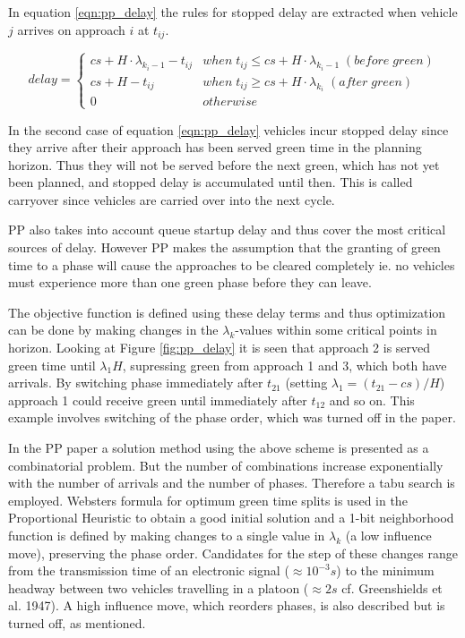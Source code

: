 In equation \ref{eqn:pp_delay} the rules for stopped delay are extracted when vehicle $j$ arrives on approach $i$ at $t_{ij}$.

\begin{equation}
delay = 
\begin{cases}
cs + H \cdot \lambda_{k_i-1} - t_{ij} & when \; t_{ij} \leq cs + H \cdot \lambda_{k_i-1} \; (before\;green)  \\
cs + H - t_{ij} & when \; t_{ij} \geq cs + H \cdot \lambda_{k_i} \; (after\;green)  \\
0 & otherwise
\end{cases}
\label{eqn:pp_delay}
\end{equation}

In the second case of equation \ref{eqn:pp_delay} vehicles incur stopped delay since they arrive after their approach has been served green time in the planning horizon. Thus they will not be served before the next green, which has not yet been planned, and stopped delay is accumulated until then. This is called carryover since vehicles are carried over into the next cycle.

PP also takes into account queue startup delay and thus cover the most critical sources of delay. However PP makes the assumption that the granting of green time to a phase will cause the approaches to be cleared completely ie. no vehicles must experience more than one green phase before they can leave.

The objective function is defined using these delay terms and thus optimization can be done by making changes in the $\lambda_k$-values within some critical points in horizon. Looking at Figure \ref{fig:pp_delay} it is seen that approach 2 is served green time until $\lambda_1 H$, supressing green from approach 1 and 3, which both have arrivals. By switching phase immediately after $t_{21}$ (setting $\lambda_1 = (t_{21} - cs)/H$) approach 1 could receive green until immediately after $t_{12}$ and so on. This example involves switching of the phase order, which was turned off in the paper.

In the PP paper \cite{1} a solution method using the above scheme is presented as a combinatorial problem. But the number of combinations increase exponentially with the number of arrivals and the number of phases. Therefore a tabu search is employed. Websters formula for optimum green time splits is used in the Proportional Heuristic to obtain a good initial solution and a 1-bit neighborhood function is defined by making changes to a single value in $\lambda_k$ (a low influence move), preserving the phase order. Candidates for the step of these changes range from the transmission time of an electronic signal ($\approx 10^{-3}s$) to the minimum headway between two vehicles travelling in a platoon ($\approx 2s$ cf. Greenshields et al. 1947).
A high influence move, which reorders phases, is also described but is turned off, as mentioned.

